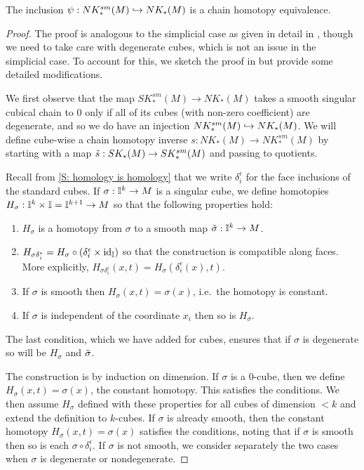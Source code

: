 \begin{proposition}\label{P: singular smooth cubes}
The inclusion $\psi: NK^{sm}_*(M)\hookrightarrow NK_*(M)$ is a chain homotopy equivalence.
\end{proposition}
\begin{proof}
The proof is analogous to the simplicial case as given in detail in \cite[Theorem 18.7]{Lee13}, though we need to take care with degenerate cubes, which is not an issue in the simplicial case. To account for this, we sketch the proof in \cite{Lee13} but provide some detailed modifications.

We first observe that the map $SK^{sm}_*(M) \to NK_*(M)$ takes a smooth singular cubical chain to $0$ only if all of its cubes (with non-zero coefficient) are degenerate, and so we do have an injection $NK^{sm}_*(M)\hookrightarrow NK_*(M)$. We will define cube-wise a chain homotopy inverse $s:NK_*(M) \to NK^{sm}_*(M)$ by starting with a map $\tilde s:SK_*(M) \to SK^{sm}_*(M)$ and passing to quotients.

Recall from \cref{S: homology is homology} that we write $\delta_i^\epsilon$ for the face inclusions of the standard cubes. If $\sigma:\mathbb{I}^k \to M$ is a singular cube, we define homotopies $H_\sigma:\mathbb{I}^k \times \mathbb{I} = \mathbb{I}^{k+1} \to M$ so that the following properties hold:
\begin{enumerate}
\item\label{I: smooth} $H_\sigma$ is a homotopy from $\sigma$ to a smooth map $\tilde \sigma:\mathbb{I}^k \to M$.

\item\label{I: faces} $H_{\sigma \delta_i^\epsilon} = H_\sigma\circ (\delta_i^\epsilon \times \mathrm{id}_{\mathbb{I}})$ so that the construction is compatible along faces. More explicitly, $H_{\sigma \delta_i^\epsilon}(x,t) = H_\sigma(\delta_i^\epsilon(x),t)$.

\item If $\sigma$ is smooth then $H_{\sigma}(x,t) = \sigma(x)$, i.e.\ the homotopy is constant.

\item\label{I: degen} If $\sigma$ is independent of the coordinate $x_i$ then so is $H_\sigma$.
\end{enumerate}

The last condition, which we have added for cubes, ensures that if $\sigma$ is degenerate so will be $H_\sigma$ and $\tilde \sigma$.

The construction is by induction on dimension. If $\sigma$ is a $0$-cube, then we define $H_\sigma(x,t) = \sigma(x)$, the constant homotopy. This satisfies the conditions. We then assume $H_\sigma$ defined with these properties for all cubes of dimension $<k$ and extend the definition to $k$-cubes. If $\sigma$ is already smooth, then the constant homotopy $H_\sigma(x,t) = \sigma(x)$ satisfies the conditions, noting that if $\sigma$ is smooth then so is each $\sigma\circ \delta_i^\epsilon$. If $\sigma$ is not smooth, we consider separately the two cases when $\sigma$ is degenerate or nondegenerate.


\end{proof}
